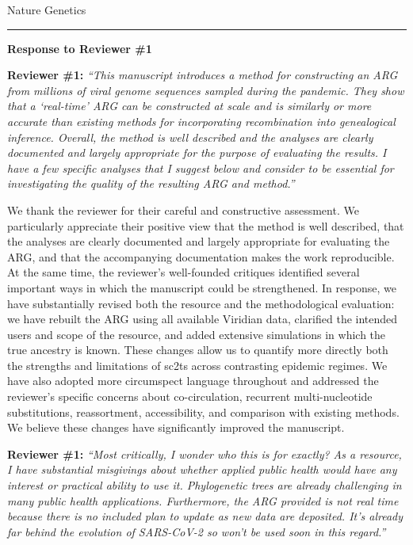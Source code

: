 \documentclass{letter}
\begin{document}
\begin{letter}{Nature Genetics}
\medskip
\hrule
\medskip

\noindent \textbf{Response to Reviewer \#1}

\noindent \textbf{Reviewer \#1:} \textit{``This manuscript introduces a method for
constructing an ARG from millions of viral genome sequences sampled during the
pandemic. They show that a `real-time' ARG can be constructed at scale and is
similarly or more accurate than existing methods for incorporating
recombination into genealogical inference. Overall, the method is well
described and the analyses are clearly documented and largely appropriate for
the purpose of evaluating the results. I have a few specific analyses that I
suggest below and consider to be essential for investigating the quality of
the resulting ARG and method.''}

We thank the reviewer for their careful and constructive assessment. We
particularly appreciate their positive view that the method is well described,
that the analyses are clearly documented and largely appropriate for evaluating
the ARG, and that the accompanying documentation makes the work reproducible.
At the same time, the reviewer's well-founded critiques identified several important
ways in which the manuscript could be strengthened. In response, we have
substantially revised both the resource and the methodological evaluation: we
have rebuilt the ARG using all available Viridian data, clarified the intended
users and scope of the resource, and added extensive simulations in which the
true ancestry is known. These changes allow us to quantify more directly both
the strengths and limitations of sc2ts across contrasting epidemic regimes. We
have also adopted more circumspect language throughout and addressed the
reviewer’s specific concerns about co-circulation, recurrent multi-nucleotide
substitutions, reassortment, accessibility, and comparison with existing
methods. We believe these changes have significantly improved the manuscript.

\noindent \textbf{Reviewer \#1:} \textit{``Most critically, I wonder who this is for
exactly? As a resource, I have substantial misgivings about whether applied
public health would have any interest or practical ability to use it.
Phylogenetic trees are already challenging in many public health
applications. Furthermore, the ARG provided is not real time because there is
no included plan to update as new data are deposited. It's already far behind
the evolution of SARS-CoV-2 so won't be used soon in this regard.''}


\end{letter}
\end{document}
